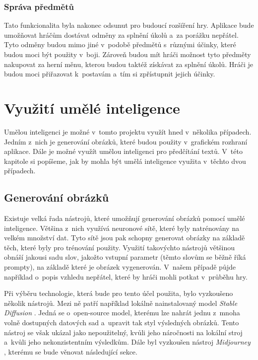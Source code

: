 \subsubsection*{Správa předmětů}
Tato funkcionalita byla nakonec odsunut pro budoucí rozšíření hry. Aplikace bude umožňovat hráčům dostávat odměny za splnění úkolů a~za porážku nepřátel. Tyto odměny budou mimo jiné v~podobě předmětů s~různými účinky, které budou moci být použity v~boji. Zároveň budou mít hráči možnost tyto předměty nakupovat za herní měnu, kterou budou taktéž získávat za splnění úkolů. Hráči je budou moci přiřazovat k~postavám a~tím si zpřístupnit jejich účinky.

\section{Využití umělé inteligence}
Umělou inteligenci je možné v~tomto projektu využít hned v~několika případech. Jedním z~nich je generování obrázků, které budou použity v~grafickém rozhraní aplikace. Dále je možné využít umělou inteligenci pro předčítání textů. V~této kapitole si popíšeme, jak by mohla být umělá inteligence využita v~těchto dvou případech.

\subsection{Generování obrázků}\label{sec:image_generation}
Existuje velká řada nástrojů, které umožňují generování obrázků pomocí umělé inteligence. Většina z~nich využívá neuronové sítě, které byly natrénovány na velkém množství dat. Tyto sítě jsou pak schopny generovat obrázky na základě těch, které byly pro trénování použity. Využití takovýchto nástrojů většinou obnáší jakousi sadu slov, jakožto vstupní parametr (těmto slovům se běžně říká prompty), na základě které je obrázek vygenerován. V~našem případě půjde například o~popis vzhledu nepřátel, které by hráči mohli potkat v~průběhu hry.

Při výběru technologie, která bude pro tento účel použita, bylo vyzkoušeno několik nástrojů. Mezi ně patří například lokálně nainstalovaný model \textit{Stable Diffusion} \cite{stability_ai}. Jedná se o~open-source model, kterému lze nahrát jednu z~mnoha volně dostupných datových sad a~upravit tak styl výsledných obrázků. Tento nástroj se však ukázal jako nepoužitelný, kvůli jeho náročnosti na lokální stroj a~kvůli jeho nekonzistentním výsledkům. Dále byl vyzkoušen nástroj \textit{Midjourney} \cite*{midjourney}, kterému se bude věnovat následující sekce.

